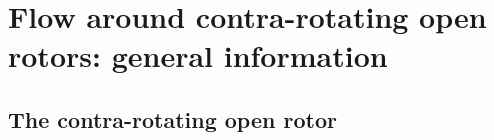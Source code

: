 \chapter{Flow around contra-rotating open rotors: general information}
\label{cha:cror_ael}

\chabstract{}

\minitoc
\newpage

\section{The contra-rotating open rotor}
\label{sec:ca_cror}


\chconclu{}

